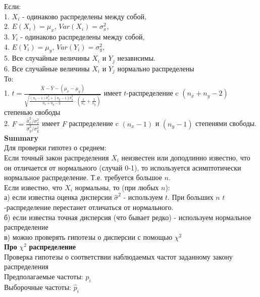 \documentclass[pdftex,12pt,a4paper]{article}
\begin{document}
Если: \\
1. $X_{i}$ - одинаково распределены между собой, \\
2. $E(X_{i})=\mu_{x}$, $Var(X_{i})=\sigma_{x}^{2}$, \\
3. $Y_{i}$ - одинаково распределены между собой, \\
4. $E(Y_{i})=\mu_{y}$, $Var(Y_{i})=\sigma_{y}^{2}$, \\
5. Все случайные величины $X_{i}$ и $Y_{j}$ независимы. \\
6. Все случайные величины $X_{i}$ и $Y_{j}$ нормально распределены \\
То: \\
1. $t=\frac{\bar{X}-\bar{Y}-(\mu_{x}-\mu_{y})} { \sqrt{
    \frac{(n_{x}-1)\hat{\sigma}_{x}^{2}+(n_{y}-1)\hat{\sigma}_{y}^{2}}{n_{x}+n_{y}-2}
    \cdot
    \left(\frac{1}{n_{x}}+\frac{1}{n_{y}}\right)
    }
}$ имеет $t$-распределение c $(n_{x}+n_{y}-2)$ степенью свободы \\
2.
$F=\frac{\hat{\sigma}_{x}^{2}/\sigma_{x}^{2}}{\hat{\sigma}_{y}^{2}/\sigma_{y}^{2}}$
имеет $F$ распределение c $(n_{x}-1)$ и $(n_{y}-1)$ степенями
свободы. \\


\textbf{Summary} \\
Для проверки гипотез о среднем:\\
Если точный закон распределения $X_{i}$ неизвестен или доподлинно
известно, что он отличается от нормального (случай 0-1), то
 используется асимптотически нормальное распределение. Т.е. требуется
 большое $n$. \\
Если известно, что $X_{i}$ нормальны, то (при любых $n$): \\
а) если известна оценка дисперсии $\hat{\sigma}^{2}$ - используем
$t$. При больших $n$ $t$-распределение перестанет отличаться от нормального. \\
б) если известна точная дисперсия (что бывает редко) - используем
нормальное распределение \\
в) можно проверять гипотезы о дисперсии с помощью $\chi^{2}$ \\



\textbf{Про} $\chi^{2}$ \textbf{распределение} \\

Проверка гипотезы о соответствии наблюдаемых частот заданному
закону распределения \\

Предполагаемые частоты: $p_{i}$ \\
Выборочные частоты: $\hat{p}_{i}$ \\
\end{document}
